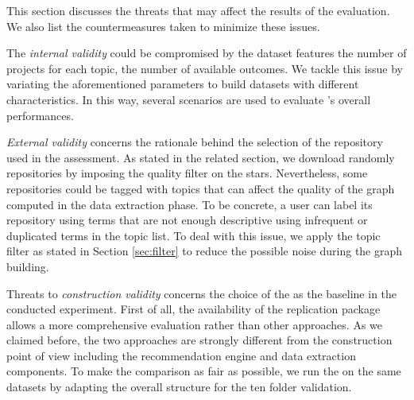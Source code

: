 
This section discusses the threats that may affect the results of the evaluation. We also list the countermeasures taken to minimize these issues.

The \emph{internal validity} could be compromised by the dataset features \ie the number of projects for each topic, the number of available outcomes. We tackle this issue by variating the aforementioned parameters to build datasets with different characteristics. In this way, several scenarios are used to evaluate \CT's overall performances.

\emph{External validity} concerns the rationale behind the selection of the \GH repository used in the assessment. As stated in the related section, we download randomly repositories by imposing the quality filter on the stars. Nevertheless, some repositories could be tagged with topics that can affect the quality of the graph computed in the data extraction phase. To be concrete, a user can label its repository using terms that are not enough descriptive \ie using infrequent or duplicated terms in the topic list. To deal with this issue, we apply the topic filter as stated in Section \ref{sec:filter} to reduce the possible noise during the graph building.

Threats to \emph{construction validity} concerns the choice of the \MNB as the baseline in the conducted experiment. First of all, the availability of the replication package allows a more comprehensive evaluation rather than other approaches. As we claimed before, the two approaches are strongly different from the construction point of view including the recommendation engine and data extraction components. To make the comparison as fair as possible, we run the \MNB on the same datasets by adapting the overall structure for the ten folder validation.